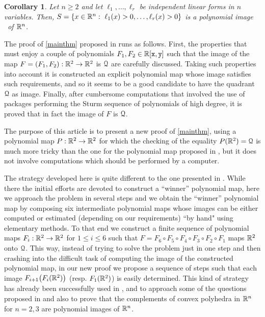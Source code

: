 \documentclass[11pt,a4paper]{amsart}
\newtheorem{cor}[theor]{Corollary}
\theoremstyle{definition}
\theoremstyle{remark}
\newcommand{\Qq}{{\EuScript Q}}
\newcommand{\x}{{\tt x}} \newcommand{\y}{{\tt y}}
\begin{document}
\begin{cor}\label{mainthm1}
Let $n\geq 2$ and let $\ell_1,\ldots,\ell_r$ be independent linear forms in $n$ variables. Then, $S=\{x\in\R^n:\ \ell_1(x)>0,\ldots,\ell_r(x)>0\}$ is a polynomial image ~of ${\mathbb R}^n$.
\end{cor}

The proof of \ref{mainthm} proposed in \cite{fg1} runs as follows. First, the properties that must enjoy a couple of polynomials $F_1,F_2\in\R[\x,\y]$ such that the image of the map $F=(F_1,F_2):{\mathbb R}^2\to{\mathbb R}^2$ is $\Qq$ are carefully discussed. Taking such properties into account it is constructed an explicit polynomial map whose image satisfies such requirements, and so it seems to be a good candidate to have the quadrant $\Qq$ as image. Finally, after cumbersome computations that involved the use of packages performing the Sturm sequence of polynomials of high degree, it is proved that in fact the image of $F$ is $\Qq$. 

The purpose of this article is to present a new proof of \ref{mainthm}, using a polynomial map $P:{\mathbb R}^2\to{\mathbb R}^2$ for which the checking of the equality $P(\R^2)=\Qq$ is much more tricky than the one for the polynomial map proposed in \cite{fg1}, but it does not involve computations which should be performed by a computer. 

The strategy developed here is quite different to the one presented in \cite{fg1}. While there the initial efforts are devoted to construct a ``winner'' polynomial map, here we approach the problem in several steps and we obtain the ``winner'' polynomial map by composing six intermediate polynomial maps whose images can be either computed or estimated (depending on our requirements) ``by hand" using elementary methods. To that end we construct a finite sequence of polynomial maps $F_i:{\mathbb R}^2\to{\mathbb R}^2$ for $1\leq i\leq 6$ such that $F=F_6\circ F_5\circ F_4\circ F_3\circ F_2\circ F_1$ maps ${\mathbb R}^2$ onto $\Qq$. This way, instead of trying to solve the problem just in one step and then crashing into the difficult task of computing the image of the constructed polynomial map, in our new proof we propose a sequence of steps such that each image $F_{i+1}\big(F_i({\mathbb R}^2)\big)$ (resp. $F_1({\mathbb R}^2)$) is easily determined. This kind of strategy has already been successfully used in \cite{fgu1}, \cite{u1} and \cite{u2} to approach some of the questions proposed in \cite{fg2} and also to prove that the complements of convex polyhedra in ${\mathbb R}^n$ for $n=2,3$ are polynomial images of ${\mathbb R}^n$. 
\end{document}
